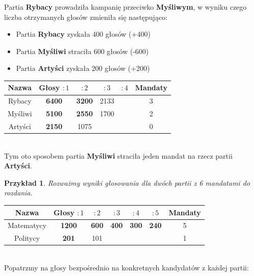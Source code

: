 \documentclass[12pt,a4paper]{article}
\theoremstyle{break}
\newtheorem{example}{Przykład}[section]
\begin{document}
Partia \textbf{Rybacy} prowadziła kampanię przeciwko \textbf{Myśliwym}, w wyniku czego liczba otrzymanych głosów zmieniła się następująco:
\begin{itemize}
	\item Partia \textbf{Rybacy} zyskała 400 głosów (+400)
	\item Partia \textbf{Myśliwi} straciła 600 głosów (-600)
	\item Partia \textbf{Artyści} zyskała 200 głosów (+200)
\end{itemize}

\begin{tabular}{|c|c|c|c|c|c|}\hline
	Nazwa    & Głosy $:1$ & $:2$ & $:3$ & $:4$ & Mandaty\\\hline
	Rybacy   & \textbf{6400} & \textbf{3200} & 2133 &       & 3\\\hline
	Myśliwi  & \textbf{5100} & \textbf{2550} & 1700 &       & 2\\\hline
	Artyści  & \textbf{2150} & 1075          &      &       & 0\\\hline
\end{tabular}\\

Tym oto sposobem partia \textbf{Myśliwi} straciła jeden mandat na rzecz partii \textbf{Artyści}.

\begin{example}
	Rozważmy wyniki głosowania dla dwóch partii z 6 mandatami do rozdania.
\end{example}

\begin{tabular}{|c|c|c|c|c|c|c|}\hline
	Nazwa        & Głosy $:1$ & $:2$ & $:3$ & $:4$ & $:5$ & Mandaty\\\hline
	Matematycy   & \textbf{1200} & \textbf{600} & \textbf{400} & \textbf{300} & \textbf{240} & 5\\\hline
	Politycy     & \textbf{201}  & 101         &       &       &       & 1\\\hline
\end{tabular}\\

Popatrzmy na głosy bezpośrednio na konkretnych kandydatów z każdej partii:
\end{document}
